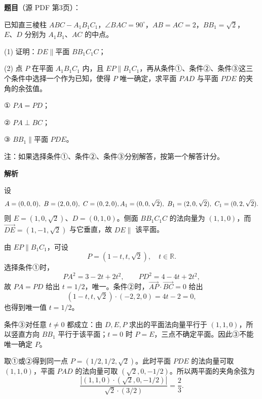 \begin{answer}

\textbf{题目}（源 PDF 第3页）：

已知直三棱柱 \(ABC-A_1B_1C_1\)，\(\angle BAC=90^\circ\)，\(AB=AC=2\)，\(BB_1=\sqrt{2}\)，\(E\text{、}D\) 分别为 \(A_1B_1\text{、}AC\) 的中点。
\nopagebreak[4]
\begin{center}\end{center}
\nopagebreak[4]
(1) 证明：\(DE\parallel\)平面 \(BB_1C_1C\)；

(2) 点 \(P\) 在平面 \(A_1B_1C_1\) 内，且 \(EP\parallel B_1C_1\)，再从条件①、条件②、条件③这三个条件中选择一个作为已知，使得 \(P\) 唯一确定，求平面 \(PAD\) 与平面 \(PDE\) 的夹角的余弦值。

① \(PA=PD\)；

② \(PA\perp BC\)；

③ \(BB_1\parallel\)平面 \(PDE\)。

注：如果选择条件①、条件②、条件③分别解答，按第一个解答计分。

\textbf{解析}


设
\nopagebreak[4]
\[
A=(0,0,0),\ B=(2,0,0),\ C=(0,2,0),\\
A_1=(0,0,\sqrt2),\ B_1=(2,0,\sqrt2),\ C_1=(0,2,\sqrt2).
\]
则 \(E=(1,0,\sqrt2)\)、\(D=(0,1,0)\)。侧面 \(BB_1C_1C\) 的法向量为 \((1,1,0)\)，而 \(\overrightarrow{DE}=(1,-1,\sqrt2)\) 与它垂直，故 \(DE\parallel\) 该平面。


由 \(EP\parallel B_1C_1\)，可设
\nopagebreak[4]
\[
P=(1-t,t,\sqrt2),\quad t\in\mathbb R.
\]
选择条件①时，
\nopagebreak[4]
\[
PA^2=3-2t+2t^2,\qquad PD^2=4-4t+2t^2,
\]
故 \(PA=PD\) 给出 \(t=1/2\)，唯一。条件②时，\(\overrightarrow{AP}\cdot\overrightarrow{BC}=0\) 给出
\nopagebreak[4]
\[
(1-t,t,\sqrt2)\cdot(-2,2,0)=4t-2=0,
\]
也得到唯一值 \(t=1/2\)。

条件③对任意 \(t\ne0\) 都成立：由 \(D,E,P\) 求出的平面法向量平行于 \((1,1,0)\)，所以竖直方向 \(BB_1\) 平行于该平面；\(t=0\) 时 \(P=E\)，三点不确定平面。因此③不能唯一确定 \(P\)。

取①或②得到同一点 \(P=(1/2,1/2,\sqrt2)\)。此时平面 \(PDE\) 的法向量可取 \((1,1,0)\)，平面 \(PAD\) 的法向量可取 \((\sqrt2,0,-1/2)\)。所以两平面的夹角余弦为
\nopagebreak[4]
\[
\frac{|(1,1,0)\cdot(\sqrt2,0,-1/2)|}{\sqrt2\cdot(3/2)}=\frac23.
\]



\end{answer}
